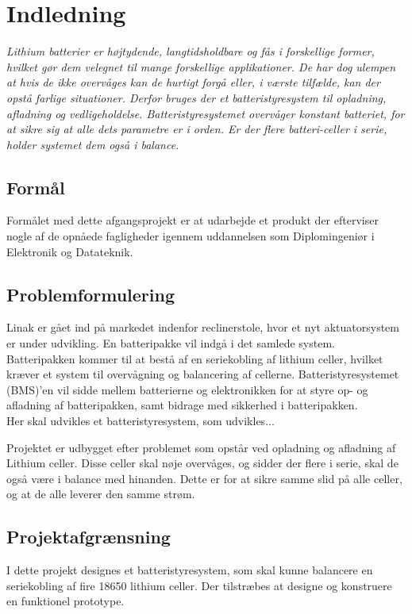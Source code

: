 \chapter{Indledning}

\emph{Lithium batterier er højtydende, langtidsholdbare og fås i forskellige former, hvilket gør dem velegnet til mange forskellige applikationer. De har dog ulempen at hvis de ikke overvåges kan de hurtigt forgå eller, i værste tilfælde, kan der opstå farlige situationer. Derfor bruges der et batteristyresystem til opladning, afladning og vedligeholdelse. Batteristyresystemet overvåger konstant batteriet, for at sikre sig at alle dets parametre er i orden. Er der flere batteri-celler i serie, holder systemet dem også i balance. }

\section{Formål}
Formålet med dette afgangsprojekt er at udarbejde et produkt der efterviser nogle af de opnåede fagligheder igennem uddannelsen som Diplomingeniør i Elektronik og Datateknik.

\section{Problemformulering}
Linak er gået ind på markedet indenfor reclinerstole, hvor et nyt aktuatorsystem er under udvikling. En batteripakke vil indgå i det samlede system. Batteripakken kommer til at bestå af en seriekobling af lithium celler, hvilket kræver et system til overvågning og balancering af cellerne. Batteristyresystemet (BMS)’en vil sidde mellem batterierne og elektronikken for at styre op- og afladning af batteripakken, samt bidrage med sikkerhed i batteripakken. \\

Her skal udvikles et batteristyresystem, som udvikles...


Projektet er udbygget efter problemet som opstår ved opladning og afladning af Lithium celler. Disse celler skal nøje overvåges, og sidder der flere i serie, skal de også være i balance med hinanden. Dette er for at sikre samme slid på alle celler, og at de alle leverer den samme strøm. 

\section{Projektafgrænsning}
I dette projekt designes et batteristyresystem, som skal kunne balancere en seriekobling af fire 18650 lithium celler. Der tilstræbes at designe og konstruere en funktionel prototype.
